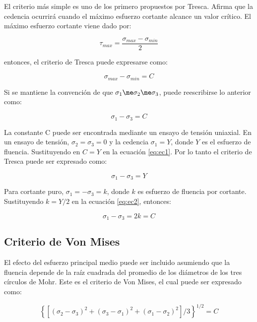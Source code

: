 El criterio más simple es uno de los primero propuestos por Tresca. Afirma que la cedencia ocurrirá cuando el máximo 
esfuerzo cortante alcance un valor crítico. El máximo esfuerzo cortante viene dado por:

\begin{equation}
\tau_{max} = \frac{\sigma_{max}-\sigma_{min}}{2}
\end{equation}

entonces, el criterio de Tresca puede expresarse como:

\begin{equation}
\sigma_{max} - \sigma_{min} = C
\end{equation}

Si se mantiene la convención de que $ \sigma_1 \me \sigma_2 \me \sigma_3 $, puede reescribirse lo anterior como:

\begin{equation}\label{eq:ec1}
\sigma_1 - \sigma_3 = C
\end{equation}

La constante C puede ser encontrada mediante un ensayo de tensión uniaxial. En un ensayo de tensión, 
$\sigma_2 = \sigma_3 = 0$ y la cedencia $\sigma_1 = Y$, donde $Y$ es el esfuerzo de fluencia. Sustituyendo 
en $C=Y$ en la ecuación \ref{eq:ec1}. Por lo tanto el criterio de Tresca puede ser expresado como:

\begin{equation}\label{eq:ec2}
\sigma_1 - \sigma_3 = Y
\end{equation}

Para cortante puro, $ \sigma_1 = -\sigma_3 = k$, donde $k$ es esfuerzo de fluencia por cortante. Sustituyendo 
$ k = Y/2 $ en la ecuación \ref{eq:ec2}, entonces:

\begin{equation}
\sigma_1 - \sigma_3 = 2k = C
\end{equation}

\subsection{Criterio de Von Mises}

El efecto del esfuerzo principal medio puede ser incluido asumiendo que la fluencia depende de la raíz cuadrada 
del promedio de los diámetros de los tres círculos de Mohr. Este es el criterio de Von Mises, el cual puede ser 
expresado como:

\begin{equation} \label{eq:ec3}
\left\{ [(\sigma_2-\sigma_3)^2 + (\sigma_3-\sigma_1 )^2 + (\sigma_1-\sigma_2 )^2]/3 \right\}^{1/2} = C
\end{equation}

